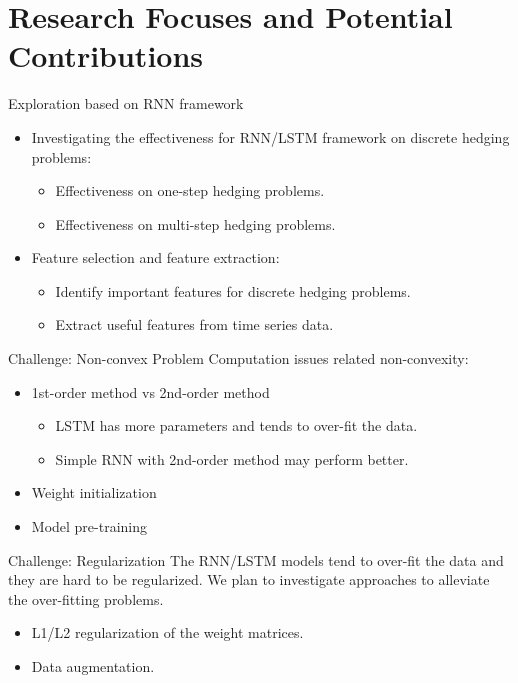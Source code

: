 \documentclass[10pt,table,mathserif]{beamer}
\begin{document}
\section{Research Focuses and Potential Contributions}
\begin{frame}{Exploration based on RNN framework}
\begin{itemize}
  \item
  Investigating the effectiveness for RNN/LSTM framework on discrete hedging problems:
  \begin{itemize}
  \item Effectiveness on one-step hedging problems.
  \item Effectiveness on multi-step hedging problems.
  \end{itemize}
  \item Feature selection and feature extraction:
  \begin{itemize}
  \item Identify important features for discrete hedging problems.
  \item Extract useful features from time series data.
  \end{itemize}
\end{itemize}
\end{frame}


\begin{frame}{Challenge: Non-convex Problem}
Computation issues related non-convexity:
\begin{itemize}
  \item 1st-order method vs 2nd-order method
  \begin{itemize}
    \item LSTM has more parameters and tends to over-fit the data.
    \item Simple RNN with 2nd-order method may perform better.
  \end{itemize}
  \item Weight initialization
  \item Model pre-training
\end{itemize}

\end{frame}


\begin{frame}{Challenge: Regularization}
The RNN/LSTM models tend to over-fit the data and they are hard to be regularized.
We plan to investigate approaches to alleviate the over-fitting problems.
\begin{itemize}
\item L1/L2 regularization of the weight matrices.
\item Data augmentation.
\end{itemize}
\end{frame}
\end{document}
